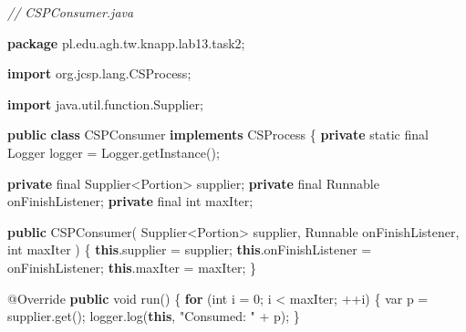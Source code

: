 \documentclass[11pt]{article}
\newenvironment{Shaded}{}{}
\newcommand{\KeywordTok}[1]{\textcolor[rgb]{0.00,0.44,0.13}{\textbf{{#1}}}}
\newcommand{\DataTypeTok}[1]{\textcolor[rgb]{0.56,0.13,0.00}{{#1}}}
\newcommand{\DecValTok}[1]{\textcolor[rgb]{0.25,0.63,0.44}{{#1}}}
\newcommand{\StringTok}[1]{\textcolor[rgb]{0.25,0.44,0.63}{{#1}}}
\newcommand{\CommentTok}[1]{\textcolor[rgb]{0.38,0.63,0.69}{\textit{{#1}}}}
\newcommand{\FunctionTok}[1]{\textcolor[rgb]{0.02,0.16,0.49}{{#1}}}
\newcommand{\NormalTok}[1]{{#1}}
\newcommand{\ImportTok}[1]{{#1}}
\newcommand{\ControlFlowTok}[1]{\textcolor[rgb]{0.00,0.44,0.13}{\textbf{{#1}}}}
\newcommand{\OperatorTok}[1]{\textcolor[rgb]{0.40,0.40,0.40}{{#1}}}
\newcommand{\BuiltInTok}[1]{{#1}}
\newcommand{\AttributeTok}[1]{\textcolor[rgb]{0.49,0.56,0.16}{{#1}}}
\begin{document}
    \begin{Shaded}
\begin{Highlighting}[]
\CommentTok{// CSPConsumer.java}

\KeywordTok{package}\ImportTok{ pl}\OperatorTok{.}\ImportTok{edu}\OperatorTok{.}\ImportTok{agh}\OperatorTok{.}\ImportTok{tw}\OperatorTok{.}\ImportTok{knapp}\OperatorTok{.}\ImportTok{lab13}\OperatorTok{.}\ImportTok{task2}\OperatorTok{;}

\KeywordTok{import} \ImportTok{org}\OperatorTok{.}\ImportTok{jcsp}\OperatorTok{.}\ImportTok{lang}\OperatorTok{.}\ImportTok{CSProcess}\OperatorTok{;}

\KeywordTok{import} \ImportTok{java}\OperatorTok{.}\ImportTok{util}\OperatorTok{.}\ImportTok{function}\OperatorTok{.}\ImportTok{Supplier}\OperatorTok{;}

\KeywordTok{public} \KeywordTok{class}\NormalTok{ CSPConsumer }\KeywordTok{implements}\NormalTok{ CSProcess }\OperatorTok{\{}
    \KeywordTok{private} \DataTypeTok{static} \DataTypeTok{final} \BuiltInTok{Logger}\NormalTok{ logger }\OperatorTok{=} \BuiltInTok{Logger}\OperatorTok{.}\FunctionTok{getInstance}\OperatorTok{();}

    \KeywordTok{private} \DataTypeTok{final}\NormalTok{ Supplier}\OperatorTok{\textless{}}\NormalTok{Portion}\OperatorTok{\textgreater{}}\NormalTok{ supplier}\OperatorTok{;}
    \KeywordTok{private} \DataTypeTok{final} \BuiltInTok{Runnable}\NormalTok{ onFinishListener}\OperatorTok{;}
    \KeywordTok{private} \DataTypeTok{final} \DataTypeTok{int}\NormalTok{ maxIter}\OperatorTok{;}

    \KeywordTok{public} \FunctionTok{CSPConsumer}\OperatorTok{(}
\NormalTok{        Supplier}\OperatorTok{\textless{}}\NormalTok{Portion}\OperatorTok{\textgreater{}}\NormalTok{ supplier}\OperatorTok{,}
        \BuiltInTok{Runnable}\NormalTok{ onFinishListener}\OperatorTok{,}
        \DataTypeTok{int}\NormalTok{ maxIter}
    \OperatorTok{)} \OperatorTok{\{}
        \KeywordTok{this}\OperatorTok{.}\FunctionTok{supplier} \OperatorTok{=}\NormalTok{ supplier}\OperatorTok{;}
        \KeywordTok{this}\OperatorTok{.}\FunctionTok{onFinishListener} \OperatorTok{=}\NormalTok{ onFinishListener}\OperatorTok{;}
        \KeywordTok{this}\OperatorTok{.}\FunctionTok{maxIter} \OperatorTok{=}\NormalTok{ maxIter}\OperatorTok{;}
    \OperatorTok{\}}

    \AttributeTok{@Override}
    \KeywordTok{public} \DataTypeTok{void} \FunctionTok{run}\OperatorTok{()} \OperatorTok{\{}
        \ControlFlowTok{for} \OperatorTok{(}\DataTypeTok{int}\NormalTok{ i }\OperatorTok{=} \DecValTok{0}\OperatorTok{;}\NormalTok{ i }\OperatorTok{\textless{}}\NormalTok{ maxIter}\OperatorTok{;} \OperatorTok{++}\NormalTok{i}\OperatorTok{)} \OperatorTok{\{}
            \DataTypeTok{var}\NormalTok{ p }\OperatorTok{=}\NormalTok{ supplier}\OperatorTok{.}\FunctionTok{get}\OperatorTok{();}
\NormalTok{            logger}\OperatorTok{.}\FunctionTok{log}\OperatorTok{(}\KeywordTok{this}\OperatorTok{,} \StringTok{"Consumed: "} \OperatorTok{+}\NormalTok{ p}\OperatorTok{);}
        \OperatorTok{\}}


\end{Highlighting}
\end{Shaded}
\end{document}

